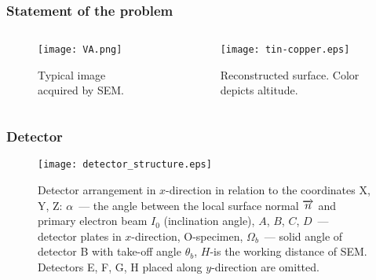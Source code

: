 \documentclass{beamer}
\begin{document}
\begin{frame}[c]
    \frametitle{Statement of the problem}
    \begin{columns}
        \begin{column}{0.38\textwidth}
            \begin{figure}
                \texttt{[image: VA.png]}
                \caption{Typical image acquired by SEM.}
            \end{figure}
        \end{column}
        \begin{column}{0.58\textwidth}
            \begin{figure}
                \texttt{[image: tin-copper.eps]}
                \caption{Reconstructed surface. Color depicts altitude.}
            \end{figure}
        \end{column}
    \end{columns}
\end{frame}

\begin{frame}[c]
    \frametitle{Detector}
    \begin{figure}
        \texttt{[image: detector\_structure.eps]}
        \caption{Detector arrangement in $x$-direction in relation to the coordinates X, Y, Z:
        \@ $\alpha$~--- the angle between the local surface normal $\protect\overrightarrow{n}$
        and primary electron beam $I_0$ (inclination angle), $A$, $B$, $C$, $D$~--- detector
        plates in $x$-direction, O-specimen, $\Omega_{b}$~--- solid angle of detector B with
        take-off angle $\theta_b$, $H$-is the working distance of SEM. Detectors E, F, G, H
        placed along $y$-direction are omitted.}
        {\label{fig:detector_structure}}%
    \end{figure}
\end{frame}
\end{document}
